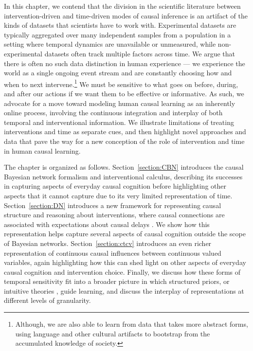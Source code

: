 \documentclass{cambridge7A}%
\newcommand{\ttodo}[2][]{\vspace{0.1cm} \hfil \todo[caption={\textbf{TG}}, size=\footnotesize, color = orange, inline, #1]{#2}}
\begin{document}
In this chapter, we contend that the division in the scientific literature between intervention-driven and time-driven modes of causal inference is an artifact of the kinds of datasets that scientists have to work with.  Experimental datasets are typically aggregated over many independent samples from a population in a setting where temporal dynamics are unavailable or unmeasured, while non-experimental datasets often track multiple factors across time.  We argue that there is often no such data distinction in human experience --- we experience the world as a single ongoing event stream and are constantly choosing how and when to next intervene.\footnote{Although, we are also able to learn from data that takes more abstract forms, using language and other cultural artifacts to bootstrap from the accumulated knowledge of society.} We must be sensitive to what goes on before, during, and after our actions if we want them to be effective or informative.  As such, we advocate for a move toward modeling human causal learning as an inherently online process, involving the continuous integration and interplay of both temporal and interventional information.  We illustrate limitations of treating interventions and time as separate cues, and then highlight novel approaches and data that pave the way for a new conception of the role of intervention and time in human causal learning.

The chapter is organized as follows.  Section~\ref{section:CBN} introduces the causal Bayesian network formalism and interventional calculus, describing its successes in capturing  aspects of everyday causal cognition before highlighting other aspects that it cannot capture due to its very limited representation of time.  Section~\ref{section:DN} introduces a new framework for representing causal structure and reasoning about interventions, where causal connections are associated with expectations about causal delays \citep{bramley2018time}.  We show how this representation helps capture several aspects of causal cognition outside the scope of Bayesian networks.  Section~\ref{section:ctcv} introduces an even richer representation of continuous causal influences between continuous valued variables, again highlighting how this can shed light on other aspects of everyday causal cognition and intervention choice.  Finally, we discuss how these forms of temporal sensitivity fit into a broader picture in which structured priors, or intuitive theories \citep{gerstenberg2017intuitive}, guide learning, and discuss the interplay of representations at different levels of granularity.
\end{document}
